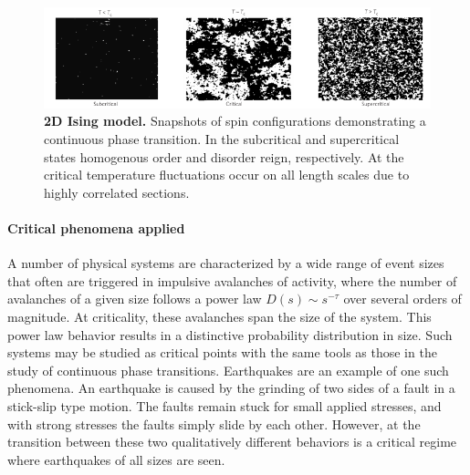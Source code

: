 \documentclass[12pt]{article}
\begin{document}
\begin{figure}      
  \begin{center}    
 \includegraphics[width=1\textwidth]{Isingchialvo}    
    \caption{\textbf{2D Ising model.} Snapshots of spin configurations demonstrating a continuous phase transition. In the subcritical and supercritical states homogenous order and disorder reign, respectively. At the critical temperature fluctuations occur on all length scales due to highly correlated sections. \cite{Chialvo2010a}}   
   \label{Figure::Ising model criticality}   
  \end{center}     
   \end{figure}
   


\paragraph*{Critical phenomena applied}

A number of physical systems are characterized by a wide range of event sizes that often are triggered in impulsive avalanches of activity, where the number of avalanches of a given size follows a power law $ D(s) \sim s^{-\tau} $ over several orders of magnitude. At criticality, these avalanches span the size of the system. This power law behavior results in a distinctive probability distribution in size. Such systems may be studied as critical points with the same tools as those in the study of continuous phase transitions. Earthquakes are an example of one such phenomena\cite{Sethna2011a}. An earthquake is caused by the grinding of two sides of a fault in a stick-slip type motion. The faults remain stuck for small applied stresses, and with strong stresses the faults simply slide by each other. However, at the transition between these two qualitatively different behaviors is a critical regime where earthquakes of all sizes are seen.  
\end{document}
